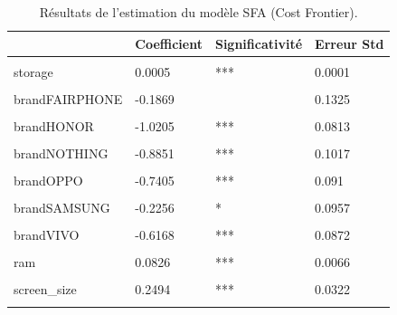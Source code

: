 \documentclass[
  12pt,
]{report}
\begin{document}
\begin{table}[!h]
\centering
\caption{\label{tab:scf_results}Résultats de l'estimation du modèle SFA (Cost Frontier).}
\centering
\begin{tabular}[t]{llll}
\toprule
\textbf{ } & \textbf{Coefficient} & \textbf{Significativité} & \textbf{Erreur Std}\\
\midrule
\cellcolor{gray!10}{(Intercept)} & \cellcolor{gray!10}{4.0863} & \cellcolor{gray!10}{***} & \cellcolor{gray!10}{0.2543}\\
storage & 0.0005 & *** & 0.0001\\
\cellcolor{gray!10}{brandASUS} & \cellcolor{gray!10}{-0.3849} & \cellcolor{gray!10}{***} & \cellcolor{gray!10}{0.1092}\\
brandFAIRPHONE & -0.1869 &  & 0.1325\\
\cellcolor{gray!10}{brandGOOGLE} & \cellcolor{gray!10}{-0.5019} & \cellcolor{gray!10}{***} & \cellcolor{gray!10}{0.099}\\
\addlinespace
brandHONOR & -1.0205 & *** & 0.0813\\
\cellcolor{gray!10}{brandMOTOROLA} & \cellcolor{gray!10}{-0.7885} & \cellcolor{gray!10}{***} & \cellcolor{gray!10}{0.0863}\\
brandNOTHING & -0.8851 & *** & 0.1017\\
\cellcolor{gray!10}{brandONEPLUS} & \cellcolor{gray!10}{-0.6815} & \cellcolor{gray!10}{***} & \cellcolor{gray!10}{0.1044}\\
brandOPPO & -0.7405 & *** & 0.091\\
\addlinespace
\cellcolor{gray!10}{brandREALME} & \cellcolor{gray!10}{-0.6727} & \cellcolor{gray!10}{***} & \cellcolor{gray!10}{0.0798}\\
brandSAMSUNG & -0.2256 & * & 0.0957\\
\cellcolor{gray!10}{brandSONY} & \cellcolor{gray!10}{-0.3962} & \cellcolor{gray!10}{***} & \cellcolor{gray!10}{0.1146}\\
brandVIVO & -0.6168 & *** & 0.0872\\
\cellcolor{gray!10}{brandXIAOMI} & \cellcolor{gray!10}{-0.7829} & \cellcolor{gray!10}{***} & \cellcolor{gray!10}{0.0578}\\
\addlinespace
ram & 0.0826 & *** & 0.0066\\
\cellcolor{gray!10}{inductionTRUE} & \cellcolor{gray!10}{0.2857} & \cellcolor{gray!10}{***} & \cellcolor{gray!10}{0.0375}\\
screen\_size & 0.2494 & *** & 0.0322\\
\cellcolor{gray!10}{made\_inInde} & \cellcolor{gray!10}{-0.151} & \cellcolor{gray!10}{} & \cellcolor{gray!10}{0.2258}\\

\end{tabular}
\end{table}
\end{document}
